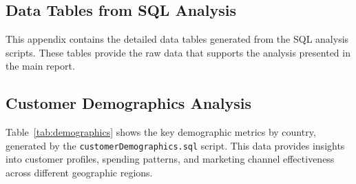 \documentclass[12pt,a4paper]{article}
\newcommand{\textittt}[1]{\texttt{#1}}
\begin{document}
\begin{appendix}
\section{Data Tables from SQL Analysis}\label{a1}

This appendix contains the detailed data tables generated from the SQL analysis scripts. These tables provide the raw data that supports the analysis presented in the main report.

\subsection{Customer Demographics Analysis}\label{a1:s1}
\label{app:customerdemographics}

Table~\ref{tab:demographics} shows the key demographic metrics by country, generated by the \textittt{customerDemographics.sql} script. This data provides insights into customer profiles, spending patterns, and marketing channel effectiveness across different geographic regions.


\end{appendix}
\end{document}
